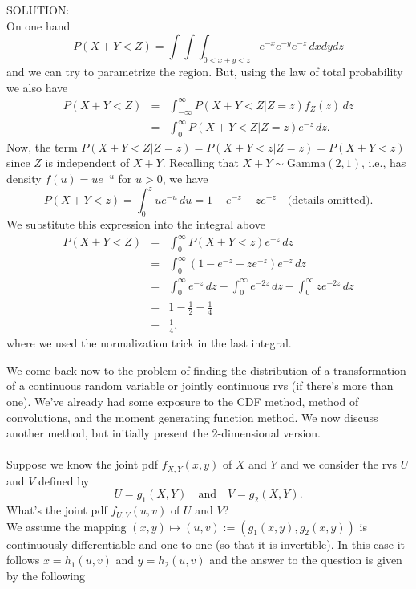 \documentclass[12pt]{article}
\begin{document}
\newpage

\noindent SOLUTION:\\
On one hand
$$P(X+Y<Z) = \int\int\int_{0<x+y<z}e^{-x}e^{-y}e^{-z}\,dxdydz$$
and we can try to parametrize the region. But, using the law of total probability we also have
\begin{eqnarray*}
P(X+Y<Z) &=&
\int_{-\infty}^{\infty}P(X+Y<Z|Z=z)f_Z(z)\,dz\\
&=&
\int_{0}^{\infty}P(X+Y<Z|Z=z)e^{-z}\,dz.
\end{eqnarray*}
Now, the term
$P(X+Y<Z|Z=z) = P(X+Y<z|Z=z)=P(X+Y<z)$ since $Z$ is independent of $X+Y$.  Recalling that $X+Y\sim \mbox{Gamma}(2,1)$, i.e., has density $f(u) = ue^{-u}$ for $u>0$,
we have
$$P(X+Y<z) = \int_0^zue^{-u}\,du=1-e^{-z}-ze^{-z}\quad \mbox{(details omitted).}$$
We substitute this expression into the integral above
\begin{eqnarray*}
P(X+Y<Z)
&=&
\int_{0}^{\infty}P(X+Y<z)e^{-z}\,dz \\
&=&
\int_{0}^{\infty}(1-e^{-z}-ze^{-z})e^{-z}\,dz \\
&=&
\int_{0}^{\infty}e^{-z}\,dz - \int_0^{\infty}e^{-2z}\,dz - \int_0^{\infty}ze^{-2z}\,dz\\
&=&
1 - \frac 12 - \frac 14 \\
&=& \frac 14,
\end{eqnarray*}
where we used the normalization trick in the last integral.




\newpage

\noindent We come back now to the problem of finding the distribution of a transformation of a continuous random variable or jointly continuous rvs (if there's more than one).
We've already had some exposure to the CDF method, method of convolutions, and the moment generating function method. We now discuss
another method, but initially present the 2-dimensional version.\\

\label{methodofjacobians}\\

Suppose we know the joint pdf $f_{X,Y}(x,y)$ of $X$ and $Y$ and we consider the rvs $U$ and $V$ defined by
$$U=g_1(X,Y)\quad \mbox{and} \quad V=g_2(X,Y).$$
What's the joint pdf $f_{U,V}(u,v)$ of $U$ and $V$?\\

\noindent We assume the mapping $(x,y)\mapsto (u,v):=(g_1(x,y),g_2(x,y))$ is continuously differentiable and one-to-one (so that it is invertible).
In this case it follows
$x=h_1(u,v)$ and $y=h_2(u,v)$ and the answer to the question is given by the following\\
\end{document}
